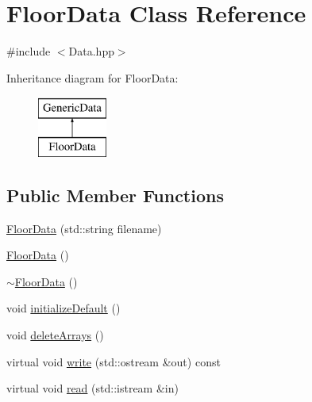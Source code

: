 \hypertarget{class_floor_data}{\section{Floor\-Data Class Reference}
\label{class_floor_data}
}


{\ttfamily \#include $<$Data.\-hpp$>$}

Inheritance diagram for Floor\-Data\-:\begin{figure}[H]
\begin{center}
\leavevmode
\includegraphics[height=2.000000cm]{class_floor_data}
\end{center}
\end{figure}
\subsection*{Public Member Functions}
\begin{DoxyCompactItemize}
\item 
\hyperlink{class_floor_data_a44d58e5e0b7461808ba4103b3a104cbe}{Floor\-Data} (std\-::string filename)
\item 
\hyperlink{class_floor_data_a3d165cd27d2deb6fc8b6a6f02f74f935}{Floor\-Data} ()
\item 
\hyperlink{class_floor_data_a2559119f4344bb8d8bed6e1f8d3c2813}{$\sim$\-Floor\-Data} ()
\item 
void \hyperlink{class_floor_data_a444c2b30a5e13fea21ce81b8deb9d14d}{initialize\-Default} ()
\item 
void \hyperlink{class_floor_data_aaee4c2e3e72268a529b162d29a98dcaf}{delete\-Arrays} ()
\item 
virtual void \hyperlink{class_floor_data_acbd1e6dfa4e2112d1e53c1dfd0703ee4}{write} (std\-::ostream \&out) const 
\item 
virtual void \hyperlink{class_floor_data_a137a204c7e37ac44eb721e984b5dad4c}{read} (std\-::istream \&in)
\end{DoxyCompactItemize}
